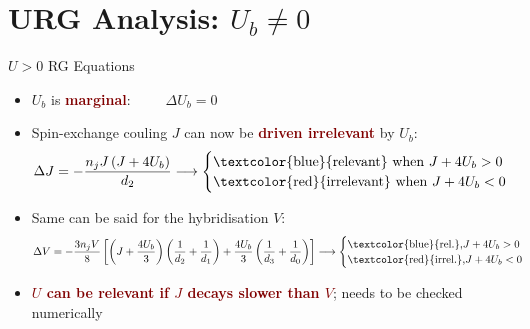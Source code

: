 \documentclass[aspectratio=169]{beamer}
\newcommand{\focus}[1]{\textcolor{maroon}{\textbf{#1}}}
\begin{document}
\section{URG Analysis: \(U_b \neq 0\)}
\label{urg-2}

\begin{frame}[noframenumbering]{\(U > 0\) RG Equations}

\begin{itemize}[<+->]
	\item \(U_b\) is \focus{marginal}: ~ ~ ~\(\Delta U_b = 0\)
	\item Spin-exchange couling \(J\) can now be \focus{driven irrelevant} by \(U_b\): 
	\begin{equation*}
	\Delta J = -\frac{n_j J\left(J + 4U_b\right)}{d_2} \longrightarrow \begin{cases}
	\text{\textcolor{blue}{relevant} when }J+4U_b > 0\\
	\text{\textcolor{red}{irrelevant} when }J+4U_b < 0\\
	\end{cases}
	\end{equation*}
	\item Same can be said for the hybridisation \(V\):
	\begin{equation*}
	\Delta V = -\frac{3n_j V}{8}\left[\left(J + \frac{4U_b}{3}\right) \left(\frac{1}{d_2} + \frac{1}{d_1}\right) + \frac{4U_b}{3}\left(\frac{1}{d_3} + \frac{1}{d_0}\right)\right] \longrightarrow \begin{cases}
	\text{\textcolor{blue}{rel.},}J+4U_b > 0\\
	\text{\textcolor{red}{irrel.},}J+4U_b < 0\\
	\end{cases}
	\end{equation*}
	\item \focus{\(U\) can be relevant if \(J\) decays slower than \(V\)}; needs to be checked numerically
\end{itemize}
\end{frame}
\end{document}
